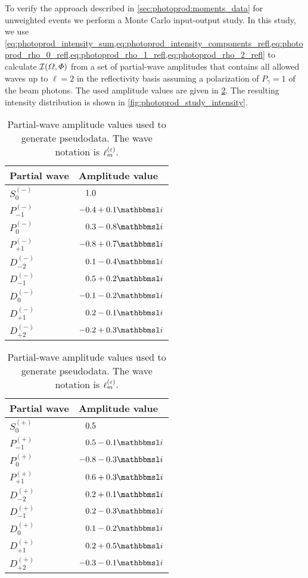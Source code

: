 To verify the approach described in \cref{sec:photoprod:moments_data}
for unweighted events we perform a Monte Carlo input-output study.  In
this study, we use
\cref{eq:photoprod_intensity_sum,eq:photoprod_intensity_components_refl,eq:photoprod_rho_0_refl,eq:photoprod_rho_1_refl,eq:photoprod_rho_2_refl}
to calculate $\mathcal{I}(\Omega, \Phi)$ from a set of partial-wave
amplitudes that contains all allowed waves up to $\ell = 2$ in the
reflectivity basis assuming a polarization of $P_\gamma = 1$ of the
beam photons.  The used amplitude values are given in
\cref{tab:photoprod_study_waveset}.  The resulting intensity
distribution is shown in \cref{fig:photoprod_study_intensity}.

\begin{table}[tbp]
  \centering%
  \renewcommand{\arraystretch}{1.2}%
  \caption{Partial-wave amplitude values used to generate pseudodata.
  The wave notation is $\ell_m^{(\varepsilon)}$.}%
  \label{tab:photoprod_study_waveset}%
  \vspace*{1ex}%
  \hfill%
  \begin{tabular}{ll}
    \toprule
    \textbf{Partial wave} &
    \textbf{Amplitude value} \\
    \midrule
    $S_0^{(-)}$    & $\hphantom{-}1.0$ \\
    $P_{-1}^{(-)}$ & $-0.4 + 0.1 \imag$ \\
    $P_0^{(-)}$    & $\hphantom{-}0.3 - 0.8 \imag$ \\
    $P_{+1}^{(-)}$ & $-0.8 + 0.7 \imag$ \\
    $D_{-2}^{(-)}$ & $\hphantom{-}0.1 - 0.4 \imag$ \\
    $D_{-1}^{(-)}$ & $\hphantom{-}0.5 + 0.2 \imag$ \\
    $D_0^{(-)}$    & $-0.1 - 0.2 \imag$ \\
    $D_{+1}^{(-)}$ & $\hphantom{-}0.2 - 0.1 \imag$ \\
    $D_{+2}^{(-)}$ & $-0.2 + 0.3 \imag$ \\
    \bottomrule
  \end{tabular}
  \hfill%
  \begin{tabular}{ll}
    \toprule
    \textbf{Partial wave} &
    \textbf{Amplitude value} \\
    \midrule
    $S_0^{(+)}$    & $\hphantom{-}0.5$ \\
    $P_{-1}^{(+)}$ & $\hphantom{-}0.5 - 0.1 \imag$ \\
    $P_0^{(+)}$    & $-0.8 - 0.3 \imag$ \\
    $P_{+1}^{(+)}$ & $\hphantom{-}0.6 + 0.3 \imag$ \\
    $D_{-2}^{(+)}$ & $\hphantom{-}0.2 + 0.1 \imag$ \\
    $D_{-1}^{(+)}$ & $\hphantom{-}0.2 - 0.3 \imag$ \\
    $D_0^{(+)}$    & $\hphantom{-}0.1 - 0.2 \imag$ \\
    $D_{+1}^{(+)}$ & $\hphantom{-}0.2 + 0.5 \imag$ \\
    $D_{+2}^{(+)}$ & $-0.3 - 0.1 \imag$ \\
    \bottomrule
  \end{tabular}
  \hfill\null%
\end{table}

